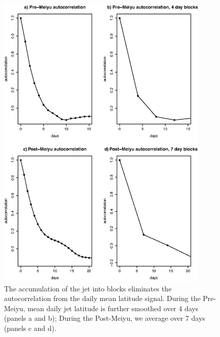 \begin{figure}[htbp]
\centering
\includegraphics[width=24pc]{Figures/ch4/jet_autocorr}
\caption{The accumulation of the jet into blocks eliminates the autocorrelation from the daily mean latitude signal. During the Pre-Meiyu, mean daily jet latitude is further smoothed over 4 days (panels a and b); During the Post-Meiyu, we average over 7 days (panels c and d).}
\label{fig:jet_autocorr}
\end{figure}
